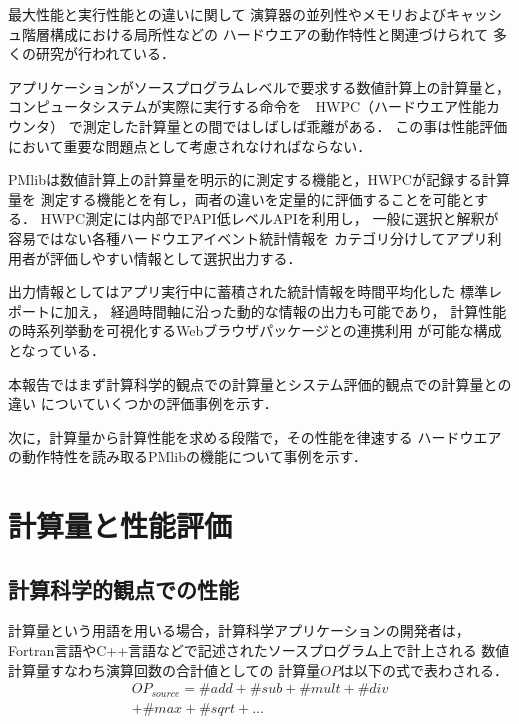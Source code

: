 \documentclass[submit,techrep,noauthor]{ipsj}
\begin{document}
最大性能と実行性能との違いに関して
演算器の並列性やメモリおよびキャッシュ階層構成における局所性などの
ハードウエアの動作特性と関連づけられて
多くの研究が行われている．

アプリケーションがソースプログラムレベルで要求する数値計算上の計算量と，
コンピュータシステムが実際に実行する命令を　HWPC（ハードウエア性能カウンタ）
で測定した計算量との間ではしばしば乖離がある．
この事は性能評価において重要な問題点として考慮されなければならない．

PMlibは数値計算上の計算量を明示的に測定する機能と，HWPCが記録する計算量を
測定する機能とを有し，両者の違いを定量的に評価することを可能とする．
HWPC測定には内部でPAPI低レベルAPIを利用し，
一般に選択と解釈が容易ではない各種ハードウエアイベント統計情報を
カテゴリ分けしてアプリ利用者が評価しやすい情報として選択出力する．

出力情報としてはアプリ実行中に蓄積された統計情報を時間平均化した
標準レポートに加え，
経過時間軸に沿った動的な情報の出力も可能であり，
計算性能の時系列挙動を可視化するWebブラウザパッケージとの連携利用
が可能な構成となっている．

本報告ではまず計算科学的観点での計算量とシステム評価的観点での計算量との違い
についていくつかの評価事例を示す．

次に，計算量から計算性能を求める段階で，その性能を律速する
ハードウエアの動作特性を読み取るPMlibの機能について事例を示す．



\section {計算量と性能評価}
\label{section:computing-volume}

\subsection {計算科学的観点での性能}
\label{subsection:scientific-perf}
計算量という用語を用いる場合，計算科学アプリケーションの開発者は，
Fortran言語やC++言語などで記述されたソースプログラム上で計上される
数値計算量すなわち演算回数の合計値としての
計算量\begin{math} OP \end{math}は以下の式で表わされる．
\begin{align*}
OP_{source} = \#add + \#sub + \#mult + \#div \\
	+ \#max + \#sqrt + ...
\end{align*}
\end{document}
